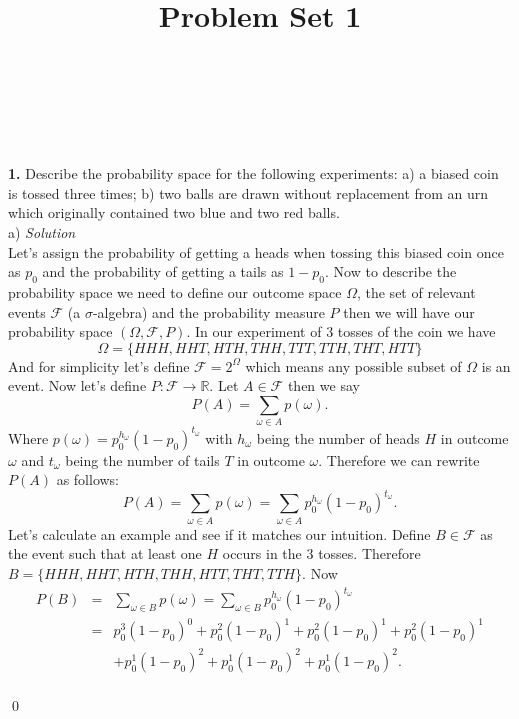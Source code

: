 \documentclass[10pt]{amsart}
\begin{document}
\noindent
{} \\
 \\
 \\
\title{Problem Set 1}
\maketitle
\noindent
{\bf 1.} Describe the probability space for the following experiments: a) a biased coin is tossed three times; b)  two balls are drawn without replacement from an urn which originally contained two blue and two red balls. \\
a) \textit{ Solution} \\
Let's assign the probability of getting a heads when tossing this biased coin once as $p_0$ and the probability of getting a tails as $1 - p_0$. 
Now to describe the probability space we need to define our outcome space $\Omega$, the set of relevant events $\mathcal{F}$ (a $\sigma$-algebra) and the
probability measure $P$ then we will have our probability space $\left(\Omega, \mathcal{F}, P\right)$. In our experiment of 3 tosses of the coin we have 
$$\Omega = \{HHH, HHT, HTH, THH, TTT, TTH, THT, HTT\}$$
And for simplicity let's define $\mathcal{F} = 2^\Omega$ which means any possible subset of $\Omega$ is an event.
Now let's define $P: \mathcal{F} \rightarrow \mathds{R}$.
Let $A \in \mathcal{F}$ then we say $$P(A) = \sum_{\omega \in A} p(\omega).$$
Where $p(\omega) = p_0^{h_{\omega}}(1 - p_0)^{t_{\omega}}$ with ${h_{\omega}}$ being the number of heads $H$ in outcome $\omega$ and ${t_{\omega}}$ being the number of tails $T$ in outcome $\omega$. 
Therefore we can rewrite $P(A)$ as follows:
$$P(A) = \sum_{\omega \in A} p(\omega) = \sum_{\omega \in A} p_0^{h_{\omega}}(1 - p_0)^{t_{\omega}}.$$
Let's calculate an example and see if it matches our intuition.
Define $B \in \mathcal{F}$ as the event such that at least one $H$ occurs in the 3 tosses.
Therefore $B = \{HHH, HHT, HTH, THH, HTT, THT, TTH\}$. Now
\begin{eqnarray*}
P(B) &=& \sum_{\omega \in B} p(\omega) = \sum_{\omega \in B} p_0^{h_{\omega}}(1 - p_0)^{t_{\omega}} \\
&=& p_0^3(1 - p_0)^0 + p_0^2(1 - p_0)^1 + p_0^2(1 - p_0)^1 + p_0^2(1 - p_0)^1 \\
&& + p_0^1(1 - p_0)^2 + p_0^1(1 - p_0)^2 + p_0^1(1 - p_0)^2.
\end{eqnarray*}
\\
\qed
\end{document}
